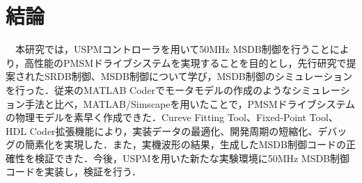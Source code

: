 
\chapter{結論}
\label{chap:結論}
　本研究では，USPMコントローラを用いて50MHz MSDB制御を行うことにより，高性能のPMSMドライブシステムを実現することを目的とし，先行研究で提案されたSRDB制御、MSDB制御について学び，MSDB制御のシミュレーションを行った．従来のMATLAB Coderでモータモデルの作成のようなシミュレーション手法と比べ，MATLAB/Simscapeを用いたことで，PMSMドライブシステムの物理モデルを素早く作成できた．Cureve Fitting Tool、Fixed-Point Tool、HDL Coder拡張機能により，実装データの最適化、開発周期の短縮化、デバッグの簡素化を実現した．また，実機波形の結果，生成したMSDB制御コードの正確性を検証できた．今後，USPMを用いた新たな実験環境に50MHz MSDB制御コードを実装し，検証を行う．
